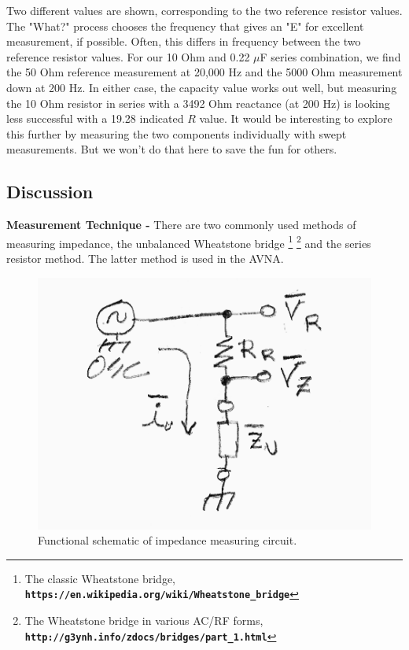 %
Two different values are shown, corresponding to the two reference resistor values.  The "What?" process chooses the frequency that gives an "E" for excellent measurement, if possible.  Often, this differs in frequency between the two reference resistor values.  For our 10 Ohm and 0.22 $\mu$F series combination, we find the 50 Ohm reference measurement at 20,000 Hz and the 5000 Ohm measurement down at 200 Hz.  In either case, the capacity value works out well, but measuring the 10 Ohm resistor in series with a 3492 Ohm reactance (at 200 Hz) is looking less successful with a 19.28 indicated \(R\) value.  It would be interesting to explore this further by measuring the two components individually with swept measurements.  But we won't do that here to save the fun for others.
%
\subsection{Discussion}
%
\textbf{Measurement Technique - } There are two commonly used methods of measuring impedance, the unbalanced Wheatstone bridge
%
\footnote{The classic Wheatstone bridge, \textbf{\texttt{https://en.wikipedia.org/wiki/Wheatstone\_bridge}}}
\footnote{The Wheatstone bridge in various AC/RF forms, \textbf{\texttt{http://g3ynh.info/zdocs/bridges/part\_1.html}}}
%
 and the series resistor method.   The latter method is used in the AVNA.
\begin{figure}[H]
\begin{center}
\includegraphics[scale=0.75]{./images/AVNA_900.pdf}
\caption{Functional schematic of impedance measuring circuit.}
\label{AVNA_900-label}
\end{center}
\end{figure}
